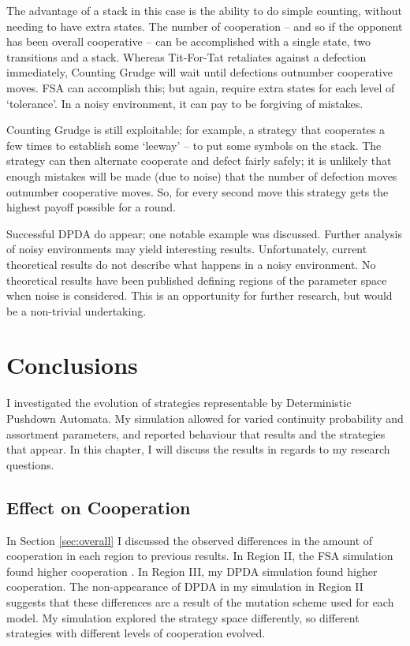 \documentclass[a4paper,11pt,bcshonoursthesis,singlespace,oneside,thesisdraft,pdflatex]{cssethesis}
\begin{document}
The advantage of a stack in this case is the ability to do simple counting, without needing to have extra states. The number of cooperation -- and so if the opponent has been overall cooperative -- can be accomplished with a single state, two transitions and a stack. 
Whereas Tit-For-Tat retaliates against a defection immediately, Counting Grudge will wait until defections outnumber cooperative moves. 
FSA can accomplish this; but again, require extra states for each level of `tolerance'. 
In a noisy environment, it can pay to be forgiving of mistakes. 

Counting Grudge is still exploitable; for example, a strategy that cooperates a few times to establish some `leeway' -- to put some symbols on the stack. 
The strategy can then alternate cooperate and defect fairly safely; it is unlikely that enough mistakes will be made (due to noise) that the number of defection moves outnumber cooperative moves. 
So, for every second move this strategy gets the highest payoff possible for a round. 

Successful DPDA do appear; one notable example was discussed. 
Further analysis of noisy environments may yield interesting results. 
Unfortunately, current theoretical results do not describe what happens in a noisy environment. 
No theoretical results have been published defining regions of the parameter space when noise is considered. This is an opportunity for further research, but would be a non-trivial undertaking. 
\chapter{Conclusions}
\label{chap:conclusions}
I investigated the evolution of strategies representable by Deterministic Pushdown Automata. 
My simulation allowed for varied continuity probability and assortment parameters, and reported behaviour that results and the strategies that appear. In this chapter, I will discuss the results in regards to my research questions.
\section{Effect on Cooperation}
In Section \ref{sec:overall} I discussed the observed differences in the amount of cooperation in each region to previous results. 
In Region II, the FSA simulation found higher cooperation \citep{van-veelen:PNAS:2012}. 
In Region III, my DPDA simulation found higher cooperation. 
The non-appearance of DPDA in my simulation in Region II suggests that these differences are a result of the mutation scheme used for each model. 
My simulation explored the strategy space differently, so different strategies with different levels of cooperation evolved. 
\end{document}
